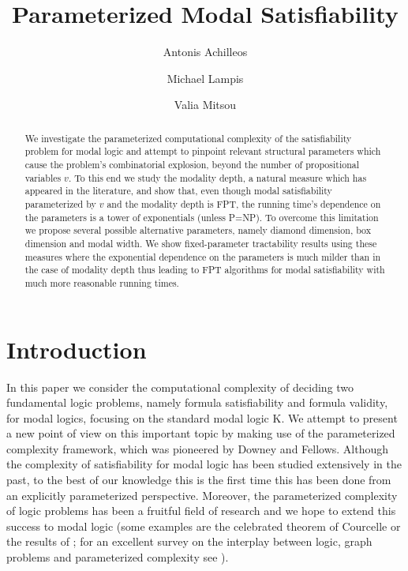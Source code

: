 \documentclass{llncs}
\begin{document}
\title{Parameterized Modal Satisfiability}

\author{Antonis Achilleos \and Michael Lampis \and Valia Mitsou}



\maketitle

\begin{abstract}
We investigate the parameterized computational complexity of the
satisfiability problem for modal logic and attempt to pinpoint
relevant structural parameters which cause the problem's
combinatorial explosion, beyond the number of propositional
variables $v$. To this end we study the modality depth, a natural
measure which has appeared in the literature, and show that, even
though modal satisfiability parameterized by $v$ and the modality
depth is FPT, the running time's dependence on the parameters is a
tower of exponentials (unless P=NP). To overcome this limitation we
propose several possible alternative parameters, namely diamond
dimension, box dimension and modal width. We show fixed-parameter
tractability results using these measures where the exponential
dependence on the parameters is much milder than in the case of
modality depth thus leading to FPT algorithms for modal
satisfiability with much more reasonable running times.

\end{abstract}


\section{Introduction}

In this paper we consider the computational complexity of deciding
two fundamental logic problems, namely formula satisfiability and
formula validity, for modal logics, focusing on the standard modal
logic K. We attempt to present a new point of view on this important
topic by making use of the parameterized complexity framework, which
was pioneered by Downey and Fellows. Although the complexity of
satisfiability for modal logic has been studied extensively in the
past, to the best of our knowledge this is the first time this has
been done from an explicitly parameterized perspective. Moreover,
the parameterized complexity of logic problems has been a fruitful
field of research and we hope to extend this success to modal logic
(some examples are the celebrated theorem of Courcelle
\cite{DBLP:journals/iandc/Courcelle90} or the results of
\cite{DBLP:journals/apal/FrickG04}; for an excellent survey on the interplay
between logic, graph problems and parameterized complexity see
\cite{DBLP:journals/eccc/Grohe07}).
\end{document}
